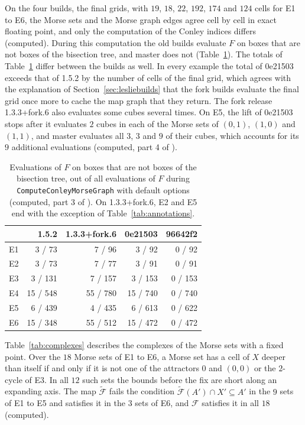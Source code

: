 \documentclass[11pt]{article}
\theoremstyle{plain}
\theoremstyle{definition}
\theoremstyle{remark}
\newcommand{\Fc}{\mathcal{F}}
\newcommand{\Ft}{\tilde{\mathcal{F}}}
\newcommand{\code}[1]{\texttt{#1}}
\begin{document}
On the four builds, the final grids, with $19$, $18$, $22$, $192$, $174$ and $124$ cells for E1 to E6, the Morse sets and the Morse graph edges agree cell by cell in exact floating point, and only the computation of the Conley indices differs (computed). During this computation the old builds evaluate $F$ on boxes that are not boxes of the bisection tree, and master does not (Table~\ref{tab:offgrid}). The totals of Table~\ref{tab:offgrid} differ between the builds as well. In every example the total of 0e21503 exceeds that of 1.5.2 by the number of cells of the final grid, which agrees with the explanation of Section~\ref{sec:lesliebuilds} that the fork builds evaluate the final grid once more to cache the map graph that they return. The fork release 1.3.3+fork.6 also evaluates some cubes several times. On E5, the lift of 0e21503 stops after it evaluates $2$ cubes in each of the Morse sets of $(0,1)$, $(1,0)$ and $(1,1)$, and master evaluates all $3$, $3$ and $9$ of their cubes, which accounts for its $9$ additional evaluations (computed, part 4 of ).

\begin{table}[tbp]
\centering
\caption{Evaluations of $F$ on boxes that are not boxes of the bisection tree, out of all evaluations of $F$ during \code{ComputeConleyMorseGraph} with default options (computed, part 3 of ). On 1.3.3+fork.6, E2 and E5 end with the exception of Table~\ref{tab:annotations}.}\label{tab:offgrid}
\begin{tabular}{lrrrr}
\toprule
 & 1.5.2 & 1.3.3+fork.6 & 0e21503 & 96642f2 \\
\midrule
E1 & 3 / 73 & 7 / 96 & 3 / 92 & 0 / 92 \\
E2 & 3 / 73 & 7 / 77 & 3 / 91 & 0 / 91 \\
E3 & 3 / 131 & 7 / 157 & 3 / 153 & 0 / 153 \\
E4 & 15 / 548 & 55 / 780 & 15 / 740 & 0 / 740 \\
E5 & 6 / 439 & 4 / 435 & 6 / 613 & 0 / 622 \\
E6 & 15 / 348 & 55 / 512 & 15 / 472 & 0 / 472 \\
\bottomrule
\end{tabular}
\end{table}

Table~\ref{tab:complexes} describes the complexes of the Morse sets with a fixed point. Over the $18$ Morse sets of E1 to E6, a Morse set has a cell of $X$ deeper than itself if and only if it is not one of the attractors $0$ and $(0,0)$ or the $2$-cycle of E3. In all $12$ such sets the bounds before the fix are short along an expanding axis. The map $\Ft$ fails the condition $\Ft(A')\cap X'\subseteq A'$ in the $9$ sets of E1 to E5 and satisfies it in the $3$ sets of E6, and $\Fc$ satisfies it in all $18$ (computed).
\end{document}
